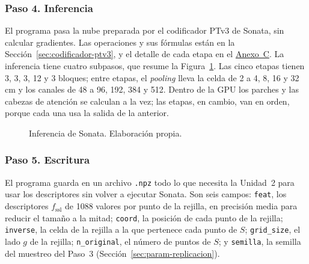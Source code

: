 \FloatBarrier
\subsubsection*{Paso 4. Inferencia}
\label{sec:u2-p4}

El programa pasa la nube preparada por el codificador PTv3 de Sonata, sin
calcular gradientes. Las operaciones y sus fórmulas están en la
Sección~\ref{sec:codificador-ptv3}, y el detalle de cada etapa en el \hyperref[sec:arq-sonata]{Anexo~C}.
La inferencia tiene cuatro subpasos, que resume la Figura~\ref{fig:m3-inferencia}.
Las cinco etapas tienen 3, 3, 3, 12 y 3 bloques; entre etapas, el
\emph{pooling} lleva la celda de 2 a 4, 8, 16 y 32\,cm y los canales de 48 a 96,
192, 384 y 512.
Dentro de la GPU los parches y las cabezas de atención se calculan a la vez; las
etapas, en cambio, van en orden, porque cada una usa la salida de la anterior.

\begin{figure}[!htbp]
\centering{}
\caption[Inferencia de Sonata]{Inferencia de Sonata. Elaboración propia.}
\label{fig:m3-inferencia}
\end{figure}

\FloatBarrier
\subsubsection*{Paso 5. Escritura}
\label{sec:u2-p5}

El programa guarda en un archivo \texttt{.npz} todo lo que necesita la
Unidad~2 para usar los descriptores sin volver a ejecutar Sonata. Son seis
campos: \texttt{feat}, los descriptores $f_{\mathrm{ssl}}$ de 1088 valores por
punto de la rejilla, en precisión media para reducir el tamaño a la mitad;
\texttt{coord}, la posición de cada punto de la rejilla; \texttt{inverse}, la
celda de la rejilla a la que pertenece cada punto de $S$; \texttt{grid\_size},
el lado $g$ de la rejilla; \texttt{n\_original}, el número de puntos de $S$; y
\texttt{semilla}, la semilla del muestreo del Paso~3
(Sección~\ref{sec:param-replicacion}).

